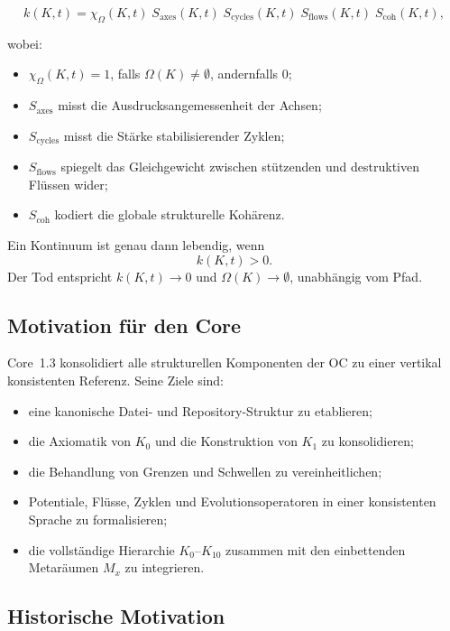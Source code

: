 \[
k(K,t) =
\chi_{\Omega}(K,t)\;
S_{\mathrm{axes}}(K,t)\;
S_{\mathrm{cycles}}(K,t)\;
S_{\mathrm{flows}}(K,t)\;
S_{\mathrm{coh}}(K,t),
\]

wobei:

\begin{itemize}
    \item \(\chi_{\Omega}(K,t)=1\), falls \(\Omega(K)\neq\emptyset\), andernfalls \(0\);
    \item \(S_{\mathrm{axes}}\) misst die Ausdrucksangemessenheit der Achsen;
    \item \(S_{\mathrm{cycles}}\) misst die Stärke stabilisierender Zyklen;
    \item \(S_{\mathrm{flows}}\) spiegelt das Gleichgewicht zwischen stützenden und destruktiven Flüssen wider;
    \item \(S_{\mathrm{coh}}\) kodiert die globale strukturelle Kohärenz.
\end{itemize}

Ein Kontinuum ist genau dann lebendig, wenn
\[
k(K,t) > 0.
\]
Der Tod entspricht \(k(K,t)\to 0\) und \(\Omega(K)\to\emptyset\), unabhängig vom Pfad.

\subsection{Motivation für den Core}

Core~1.3 konsolidiert alle strukturellen Komponenten der OC zu einer vertikal konsistenten Referenz.  
Seine Ziele sind:

\begin{itemize}
    \item eine kanonische Datei- und Repository-Struktur zu etablieren;
    \item die Axiomatik von \(K_0\) und die Konstruktion von \(K_1\) zu konsolidieren;
    \item die Behandlung von Grenzen und Schwellen zu vereinheitlichen;
    \item Potentiale, Flüsse, Zyklen und Evolutionsoperatoren in einer konsistenten Sprache zu formalisieren;
    \item die vollständige Hierarchie \(K_0\)–\(K_{10}\) zusammen mit den einbettenden Metaräumen \(M_x\) zu integrieren.
\end{itemize}

\subsection{Historische Motivation}

